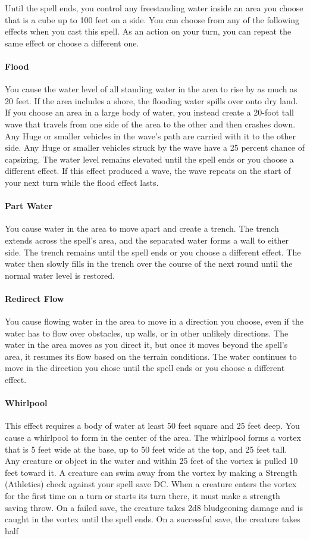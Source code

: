 \documentclass[12pt,showtrims]{memoir}
\begin{document}
\vspace{1\baselineskip}\noindent Until the spell ends, you control any freestanding water inside an area you choose that is a cube up to 100 feet on a side. You can choose from any of the following effects when you cast this spell. As an action on your turn, you can repeat the same effect or choose a different one. \paragraph{Flood} You cause the water level of all standing water in the area to rise by as much as 20 feet. If the area includes a shore, the flooding water spills over onto dry land. If you choose an area in a large body of water, you instead create a 20-foot tall wave that travels from one side of the area to the other and then crashes down. Any Huge or smaller vehicles in the wave's path are carried with it to the other side. Any Huge or smaller vehicles struck by the wave have a 25 percent chance of capsizing. The water level remains elevated until the spell ends or you choose a different effect. If this effect produced a wave, the wave repeats on the start of your next turn while the flood effect lasts. \paragraph{Part Water} You cause water in the area to move apart and create a trench. The trench extends across the spell's area, and the separated water forms a wall to either side. The trench remains until the spell ends or you choose a different effect. The water then slowly fills in the trench over the course of the next round until the normal water level is restored. \paragraph{Redirect Flow} You cause flowing water in the area to move in a direction you choose, even if the water has to flow over obstacles, up walls, or in other unlikely directions. The water in the area moves as you direct it, but once it moves beyond the spell's area, it resumes its flow based on the terrain conditions. The water continues to move in the direction you chose until the spell ends or you choose a different effect. \paragraph{Whirlpool} This effect requires a body of water at least 50 feet square and 25 feet deep. You cause a whirlpool to form in the center of the area. The whirlpool forms a vortex that is 5 feet wide at the base, up to 50 feet wide at the top, and 25 feet tall. Any creature or object in the water and within 25 feet of the vortex is pulled 10 feet toward it. A creature can swim away from the vortex by making a Strength (Athletics) check against your spell save DC. When a creature enters the vortex for the first time on a turn or starts its turn there, it must make a strength saving throw. On a failed save, the creature takes 2d8 bludgeoning damage and is caught in the vortex until the spell ends. On a successful save, the creature takes half 
\end{document}
